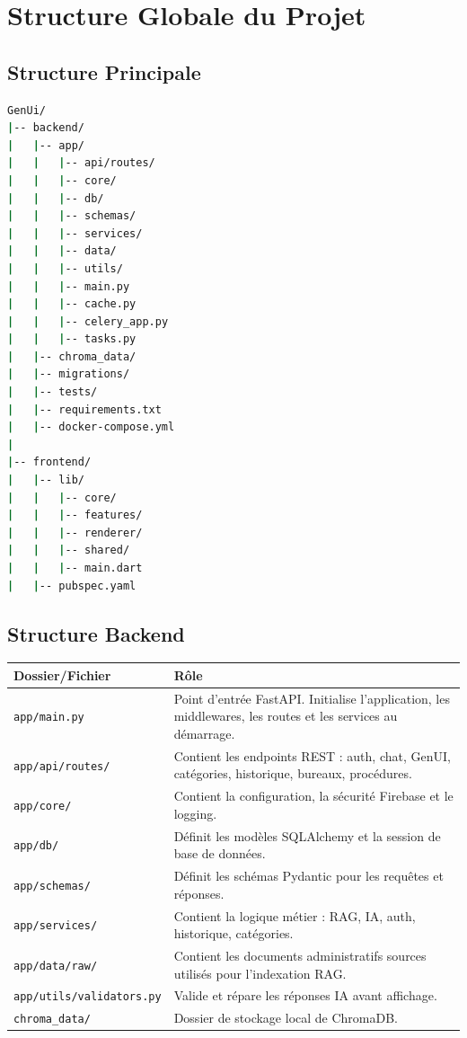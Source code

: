 \documentclass[12pt,a4paper]{report}
\begin{document}

\chapter{Structure Globale du Projet}

\section{Structure Principale}

\begin{lstlisting}[language=bash,caption={Structure globale du projet}]
GenUi/
|-- backend/
|   |-- app/
|   |   |-- api/routes/
|   |   |-- core/
|   |   |-- db/
|   |   |-- schemas/
|   |   |-- services/
|   |   |-- data/
|   |   |-- utils/
|   |   |-- main.py
|   |   |-- cache.py
|   |   |-- celery_app.py
|   |   |-- tasks.py
|   |-- chroma_data/
|   |-- migrations/
|   |-- tests/
|   |-- requirements.txt
|   |-- docker-compose.yml
|
|-- frontend/
|   |-- lib/
|   |   |-- core/
|   |   |-- features/
|   |   |-- renderer/
|   |   |-- shared/
|   |   |-- main.dart
|   |-- pubspec.yaml
\end{lstlisting}

\section{Structure Backend}

\begin{longtable}{|p{4cm}|p{10cm}|}
\hline
\textbf{Dossier/Fichier} & \textbf{Rôle} \\
\hline
\endhead
\texttt{app/main.py} & Point d'entrée FastAPI. Initialise l'application, les middlewares, les routes et les services au démarrage. \\
\hline
\texttt{app/api/routes/} & Contient les endpoints REST : auth, chat, GenUI, catégories, historique, bureaux, procédures. \\
\hline
\texttt{app/core/} & Contient la configuration, la sécurité Firebase et le logging. \\
\hline
\texttt{app/db/} & Définit les modèles SQLAlchemy et la session de base de données. \\
\hline
\texttt{app/schemas/} & Définit les schémas Pydantic pour les requêtes et réponses. \\
\hline
\texttt{app/services/} & Contient la logique métier : RAG, IA, auth, historique, catégories. \\
\hline
\texttt{app/data/raw/} & Contient les documents administratifs sources utilisés pour l'indexation RAG. \\
\hline
\texttt{app/utils/validators.py} & Valide et répare les réponses IA avant affichage. \\
\hline
\texttt{chroma\_data/} & Dossier de stockage local de ChromaDB. \\
\hline
\end{longtable}
\end{document}
